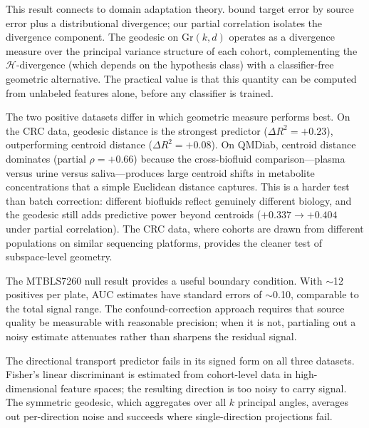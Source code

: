 \documentclass{article}
\begin{document}
This result connects to domain adaptation theory. \citet{bendavid2010theory} bound target error by source error plus a distributional divergence; our partial correlation isolates the divergence component. The geodesic on $\mathrm{Gr}(k, d)$ operates as a divergence measure over the principal variance structure of each cohort, complementing the $\mathcal{H}$-divergence (which depends on the hypothesis class) with a classifier-free geometric alternative. The practical value is that this quantity can be computed from unlabeled features alone, before any classifier is trained.

The two positive datasets differ in which geometric measure performs best. On the CRC data, geodesic distance is the strongest predictor ($\Delta R^2 = +0.23$), outperforming centroid distance ($\Delta R^2 = +0.08$). On QMDiab, centroid distance dominates (partial $\rho = +0.66$) because the cross-biofluid comparison---plasma versus urine versus saliva---produces large centroid shifts in metabolite concentrations that a simple Euclidean distance captures. This is a harder test than batch correction: different biofluids reflect genuinely different biology, and the geodesic still adds predictive power beyond centroids ($+0.337 \to +0.404$ under partial correlation). The CRC data, where cohorts are drawn from different populations on similar sequencing platforms, provides the cleaner test of subspace-level geometry.

The MTBLS7260 null result provides a useful boundary condition. With $\sim$12 positives per plate, AUC estimates have standard errors of $\sim$0.10, comparable to the total signal range. The confound-correction approach requires that source quality be measurable with reasonable precision; when it is not, partialing out a noisy estimate attenuates rather than sharpens the residual signal.

The directional transport predictor fails in its signed form on all three datasets. Fisher's linear discriminant is estimated from cohort-level data in high-dimensional feature spaces; the resulting direction is too noisy to carry signal. The symmetric geodesic, which aggregates over all $k$ principal angles, averages out per-direction noise and succeeds where single-direction projections fail.
\end{document}
